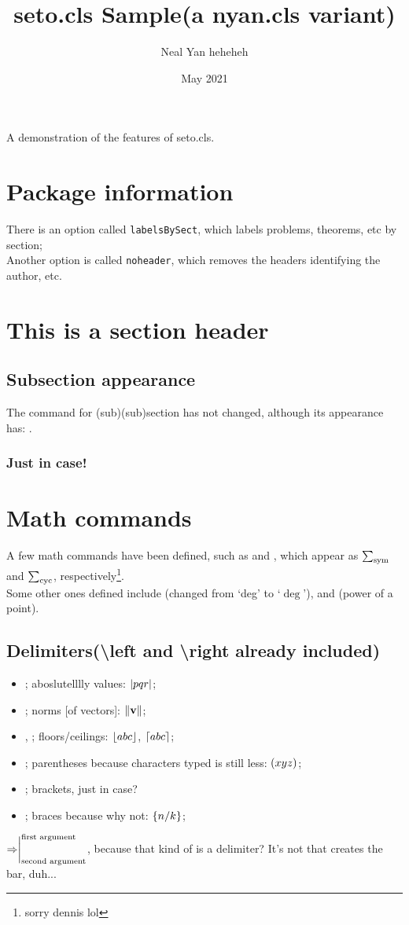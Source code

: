 \documentclass[labelsBySect]{seto}
\title{seto.cls Sample(a nyan.cls variant)}
\author{Neal Yan heheheh}
\date{May 2021}
\begin{document}
\maketitle
A demonstration of the features of seto.cls.
\section*{Package information}
There is an option called \texttt{labelsBySect}, which labels problems, theorems, etc by section;\\
Another option is called \texttt{noheader}, which removes the headers identifying the author, etc.
\toc 
\section{This is a section header}
\subsection{Subsection appearance}
The command for (sub)(sub)section has not changed, although its appearance has: .
\subsubsection{Just in case!}
\section{Math commands}
A few math commands have been defined, such as  and , which appear as $\symsum$ and $\cycsum$, respectively\footnote{sorry dennis lol}.\\
Some other ones defined include (changed from `deg' to `$\deg$'), and (power of a point).
\subsection{Delimiters(\textbackslash left and \textbackslash right already included)}
\begin{itemize}
    \item{}; aboslutelllly values: $\abs{pqr}$;
    \item{}; norms [of vectors]: $\norm{\textbf{v}}$;
    \item{}, ; floors/ceilings: $\floor{abc}$, $\ceil{abc}$;
    \item{}; parentheses because characters typed is still less: $\parenth{xyz}$;
    \item{}; brackets, just in case?
    \item{}; braces because why not: $\braces{n/k}$;
\end{itemize}
$\Rightarrow\evalat[\text{first argument}]{\text{second argument}}$, because that kind of is a delimiter? It's not  that creates the bar, duh...
\end{document}
